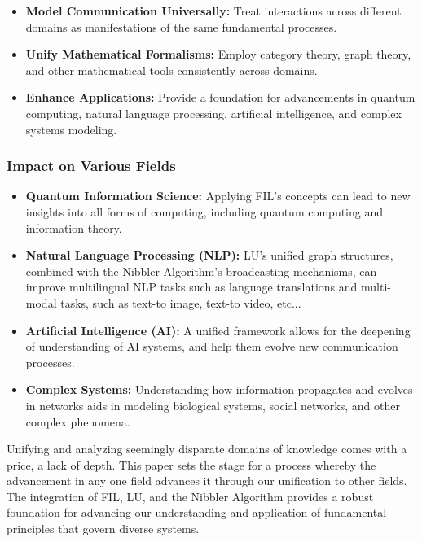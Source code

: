 \begin{itemize}[leftmargin=*, labelsep=5mm]
    \item \textbf{Model Communication Universally:} Treat interactions across different domains as manifestations of the same fundamental processes.
    \item \textbf{Unify Mathematical Formalisms:} Employ category theory, graph theory, and other mathematical tools consistently across domains.
    \item \textbf{Enhance Applications:} Provide a foundation for advancements in quantum computing, natural language processing, artificial intelligence, and complex systems modeling.
\end{itemize}

\subsubsection{Impact on Various Fields}

\begin{itemize}[leftmargin=*, labelsep=5mm]
    \item \textbf{Quantum Information Science:} Applying FIL's concepts can lead to new insights into all forms of computing, including quantum computing and information theory.
    \item \textbf{Natural Language Processing (NLP):} LU's unified graph structures, combined with the Nibbler Algorithm's broadcasting mechanisms, can improve multilingual NLP tasks such as language translations and multi-modal tasks, such as text-to image, text-to video, etc...
    \item \textbf{Artificial Intelligence (AI):} A unified framework allows for the deepening of understanding of AI systems, and help them evolve new communication processes.
    \item \textbf{Complex Systems:} Understanding how information propagates and evolves in networks aids in modeling biological systems, social networks, and other complex phenomena.
\end{itemize}

Unifying and analyzing seemingly disparate domains of knowledge comes with a price, a lack of depth. This paper sets the stage for a process whereby the advancement in any one field advances it through our unification to other fields. The integration of FIL, LU, and the Nibbler Algorithm provides a robust foundation for advancing our understanding and application of fundamental principles that govern diverse systems.
